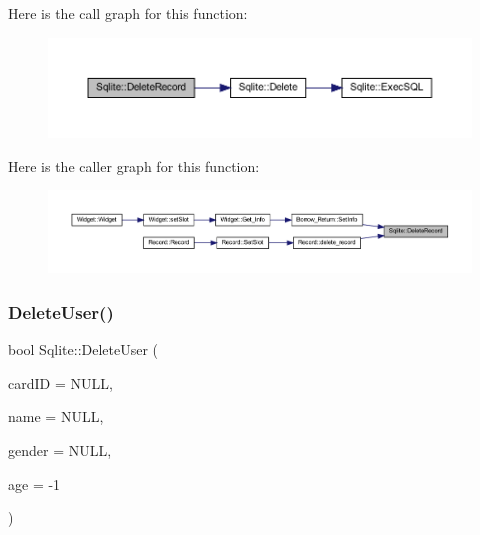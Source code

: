 Here is the call graph for this function\+:
\nopagebreak
\begin{figure}[H]
\begin{center}
\leavevmode
\includegraphics[width=350pt]{class_sqlite_aa120de86db20f42a61a5c2eae9ad6b89_cgraph}
\end{center}
\end{figure}
Here is the caller graph for this function\+:
\nopagebreak
\begin{figure}[H]
\begin{center}
\leavevmode
\includegraphics[width=350pt]{class_sqlite_aa120de86db20f42a61a5c2eae9ad6b89_icgraph}
\end{center}
\end{figure}
\mbox{\label{class_sqlite_af2b581d800d01e1f1281d98ec1341ddd}} 
\subsubsection{\texorpdfstring{DeleteUser()}{DeleteUser()}}
{\footnotesize\ttfamily bool Sqlite\+::\+Delete\+User (\begin{DoxyParamCaption}\item[{Q\+String}]{card\+ID = {\ttfamily NULL},  }\item[{Q\+String}]{name = {\ttfamily NULL},  }\item[{Q\+String}]{gender = {\ttfamily NULL},  }\item[{int}]{age = {\ttfamily -\/1} }\end{DoxyParamCaption})}

